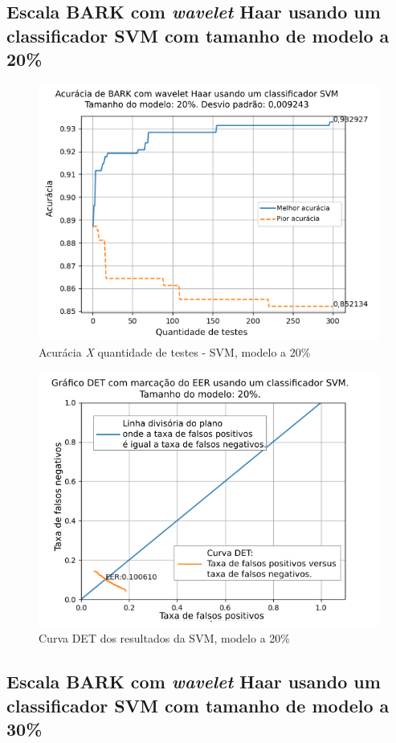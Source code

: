 		\FloatBarrier
		\subsection{Escala BARK com \textit{wavelet} Haar usando um classificador SVM com tamanho de modelo a 20\%}

			
			
			\begin{figure}[h]
				\centering
				\includegraphics[width=.6\linewidth]{images/results/confusionMatrices/classifier_SVM_20.png}
				\caption{Acurácia \textit{X} quantidade de testes - SVM, modelo a 20\%}
				\label{fig:classifiersvm20}
			\end{figure}
		
			\begin{figure}[H]
				\centering
				\includegraphics[width=.6\linewidth]{images/results/det/DET_SVM_20}
				\caption{Curva DET dos resultados da SVM, modelo a 20\%}
				\label{fig:detsvm20}
			\end{figure}

			\FloatBarrier
		\subsection{Escala BARK com \textit{wavelet} Haar usando um classificador SVM com tamanho de modelo a 30\%}
			
			
